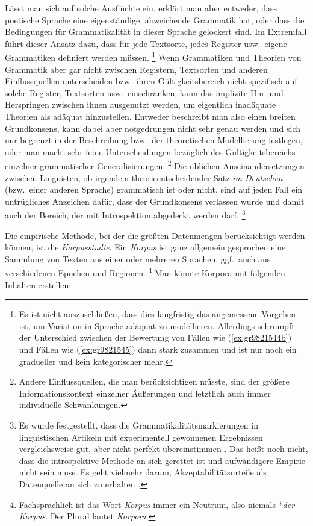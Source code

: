Lässt man sich auf solche Ausflüchte ein, erklärt man aber entweder, dass poetische Sprache eine eigenständige, abweichende Grammatik hat, oder dass die Bedingungen für Grammatikalität in dieser Sprache gelockert sind.
Im Extremfall führt dieser Ansatz dazu, dass für jede Textsorte, jedes Register usw.\ eigene Grammatiken definiert werden müssen.%
\footnote{Es ist nicht auszuschließen, dass dies langfristig das angemessene Vorgehen ist, um Variation in Sprache adäquat zu modellieren.
Allerdings schrumpft der Unterschied zwischen der Bewertung von Fällen wie (\ref{ex:gr9821544b}) und Fällen wie (\ref{ex:gr9821545}) dann stark zusammen und ist nur noch ein gradueller und kein kategorischer mehr.}
Wenn Grammatiken und Theorien von Grammatik aber gar nicht zwischen Registern, Textsorten und anderen Einflussquellen unterscheiden bzw.\ ihren Gültigkeitsbereich nicht spezifisch auf solche Register, Textsorten usw.\ einschränken, kann das implizite Hin- und Herspringen zwischen ihnen ausgenutzt werden, um eigentlich inadäquate Theorien als adäquat hinzustellen.
Entweder beschreibt man also einen breiten Grundkonsens, kann dabei aber notgedrungen nicht sehr genau werden und sich nur begrenzt in der Beschreibung bzw.\ der theoretischen Modellierung festlegen, oder man macht sehr feine Unterscheidungen bezüglich des Gültigkeitsbereichs einzelner grammatischer Generalisierungen.%
\footnote{Andere Einflussquellen, die man berücksichtigen müsste, sind \zB der größere Informationskontext einzelner Äußerungen und letztlich auch immer individuelle Schwankungen.}
Die üblichen Auseinandersetzungen zwischen Linguisten, ob irgendein theorieentscheidender Satz \textit{im Deutschen} (bzw.\ einer anderen Sprache) grammatisch ist oder nicht, sind auf jeden Fall ein untrügliches Anzeichen dafür, dass der Grundkonsens verlassen wurde und damit auch der Bereich, der mit Introspektion abgedeckt werden darf.%
\footnote{Es wurde festgestellt, dass die Grammatikalitätsmarkierungen in linguistischen Artikeln mit experimentell gewonnenen Ergebnissen vergleichsweise gut, aber nicht perfekt übereinstimmen \citep{SprouseEa2013}.
	Das heißt noch nicht, dass die introspektive Methode an sich gerettet ist und aufwändigere Empirie nicht sein muss.
	Es geht vielmehr darum, Akzeptabilitätsurteile als Datenquelle an sich zu erhalten \citep{SchuetzeSprouse2014}.}

Die empirische Methode, bei der die größten Datenmengen berücksichtigt werden können, ist die \textit{Korpusstudie}.
Ein \textit{Korpus} ist ganz allgemein gesprochen eine Sammlung von Texten aus einer oder mehreren Sprachen, ggf.\ auch aus verschiedenen Epochen und Regionen.%
\footnote{Fachsprachlich ist das Wort \textit{Korpus} immer ein Neutrum, also niemals *\textit{der Korpus}.
Der Plural lautet \textit{Korpora}.}
Man könnte \zB Korpora mit folgenden Inhalten erstellen:

